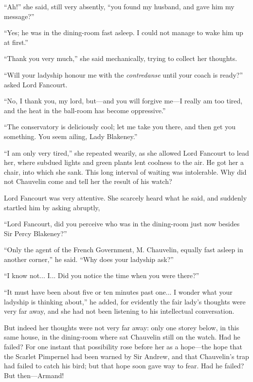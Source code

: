\enquote{Ah!} she said, still very absently, \enquote{you found my husband, and gave him my message?}

\enquote{Yes; he was in the dining-room fast asleep. I could not manage to wake him up at first.}

\enquote{Thank you very much,} she said mechanically, trying to collect her thoughts.

\enquote{Will your ladyship honour me with the \textit{contredanse} until your coach is ready?} asked Lord Fancourt.

\enquote{No, I thank you, my lord, but---and you will forgive me---I really am too tired, and the heat in the ball-room has become oppressive.}

\enquote{The conservatory is deliciously cool; let me take you there, and then get you something. You seem ailing, Lady Blakeney.}

\enquote{I am only very tired,} she repeated wearily, as she allowed Lord Fancourt to lead her, where subdued lights and green plants lent coolness to the air. He got her a chair, into which she sank. This long interval of waiting was intolerable. Why did not Chauvelin come and tell her the result of his watch?

Lord Fancourt was very attentive. She scarcely heard what he said, and suddenly startled him by asking abruptly,\longdash


\enquote{Lord Fancourt, did you perceive who was in the dining-room just now besides Sir Percy Blakeney?}

\enquote{Only the agent of the French Government, M. Chauvelin, equally fast asleep in another corner,} he said. \enquote{Why does your ladyship ask?}

\enquote{I know not... I... Did you notice the time when you were there?}

\enquote{It must have been about five or ten minutes past one... I wonder what your ladyship is thinking about,} he added, for evidently the fair lady's thoughts were very far away, and she had not been listening to his intellectual conversation.

But indeed her thoughts were not very far away: only one storey below, in this same house, in the dining-room where sat Chauvelin still on the watch. Had he failed? For one instant that possibility rose before her as a hope---the hope that the Scarlet Pimpernel had been warned by Sir Andrew, and that Chauvelin's trap had failed to catch his bird; but that hope soon gave way to fear. Had he failed? But then---Armand!

